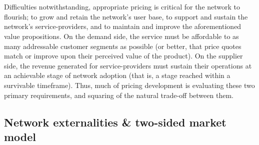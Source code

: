 \documentclass[longbibliography,nofootinbib]{revtex4-1}
\begin{document}
\\\\
Difficulties notwithstanding, appropriate pricing is critical for the network to flourish; to grow and retain the network’s user base, to support and sustain the network’s service-providers, and to maintain and improve the aforementioned value propositions. On the demand side, the service must be affordable to as many addressable customer segments as possible (or better, that price quotes match or improve upon their perceived value of the product). On the supplier side, the revenue generated for service-providers must sustain their operations at an achievable stage of network adoption (that is, a stage reached within a survivable timeframe). Thus, much of pricing development is evaluating these two primary requirements, and squaring of the natural trade-off between them.

\subsection{Network externalities \& two-sided market model}
\end{document}
